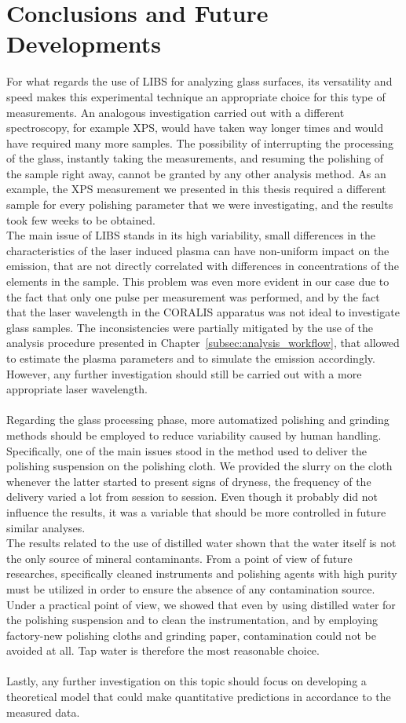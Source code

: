 \chapter{Conclusions and Future Developments}
\label{ch:conclusions_and_dev}
For what regards the use of LIBS for analyzing glass surfaces, its versatility and speed makes this experimental technique an appropriate choice for this type of measurements. An analogous investigation carried out with a different spectroscopy, for example XPS, would have taken way longer times and would have required many more samples. The possibility of interrupting the processing of the glass, instantly taking the measurements, and resuming the polishing of the sample right away, cannot be granted by any other analysis method. As an example, the XPS measurement we presented in this thesis required a different sample for every polishing parameter that we were investigating, and the results took few weeks to be obtained.
\\
The main issue of LIBS stands in its high variability, small differences in the characteristics of the laser induced plasma can have non-uniform impact on the emission, that are not directly correlated with differences in concentrations of the elements in the sample. This problem was even more evident in our case due to the fact that only one pulse per measurement was performed, and by the fact that the laser wavelength in the CORALIS apparatus was not ideal to investigate glass samples. The inconsistencies were partially mitigated by the use of the analysis procedure presented in Chapter~\ref{subsec:analysis_workflow}, that allowed to estimate the plasma parameters and to simulate the emission accordingly. However, any further investigation should still be carried out with a more appropriate laser wavelength.
\\
\\
Regarding the glass processing phase, more automatized polishing and grinding methods should be employed to reduce variability caused by human handling. Specifically, one of the main issues stood in the method used to deliver the polishing suspension on the polishing cloth. We provided the slurry on the cloth whenever the latter started to present signs of dryness, the frequency of the delivery varied a lot from session to session. Even though it probably did not influence the results, it was a variable that should be more controlled in future similar analyses.
\\
The results related to the use of distilled water shown that the water itself is not the only source of mineral contaminants. From a point of view of future researches, specifically cleaned instruments and polishing agents with high purity must be utilized in order to ensure the absence of any contamination source. Under a practical point of view, we showed that even by using distilled water for the polishing suspension and to clean the instrumentation, and by employing factory-new polishing cloths and grinding paper, contamination could not be avoided at all. Tap water is therefore the most reasonable choice.
\\
\\
Lastly, any further investigation on this topic should focus on developing a theoretical model that could make quantitative predictions in accordance to the measured data.